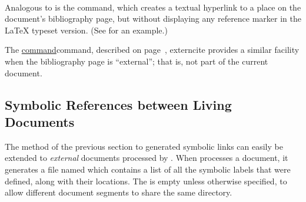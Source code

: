 %
\paragraph*{\label{htmlcite}}
\begin{changebar}
Analogous to  is the  command,
which creates a textual hyperlink to a place on the document's bibliography page, 
but without displaying any reference marker in the \LaTeX{} typeset version.
(See  for an example.)%

The  
\hyperref[page]{command}{command, described on page~}{, }{externcite}
provides a similar facility when the bibliography page is ``external'';
that is, not part of the current document.%
\end{changebar}




\subsection{Symbolic References between Living Documents\label{external_cross}}%
\tableofchildlinks*
{}
%
%
%
%
%
\begin{changebar}
The method of the previous section to generated
symbolic  links can
easily be extended to \emph{external} documents processed by \latextohtml.  
When \latextohtml{} processes a document, it generates a \Perl{} file 
named 
which contains a list of all the symbolic labels that were defined, 
along with their locations.  
The  is empty unless otherwise specified, 
to allow different document segments to share the same directory.  
\end{changebar}

%
%
